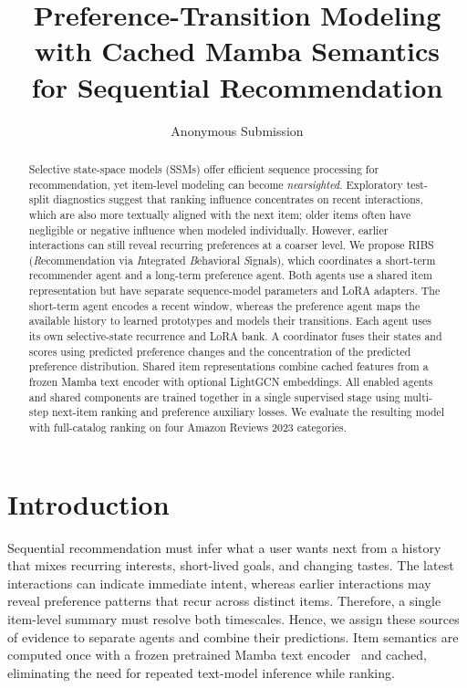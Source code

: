 ﻿\documentclass[sigconf,anonymous,review]{acmart}
\title{Preference-Transition Modeling with Cached Mamba Semantics\\for Sequential Recommendation}
\author{Anonymous Submission}
\begin{document}
\begin{abstract}
Selective state-space models (SSMs) offer efficient sequence processing for recommendation, yet item-level modeling can become \emph{nearsighted}. Exploratory test-split diagnostics suggest that ranking influence concentrates on recent interactions, which are also more textually aligned with the next item; older items often have negligible or negative influence when modeled individually. However, earlier interactions can still reveal recurring preferences at a coarser level. We propose RIBS (\emph{R}ecommendation via \emph{I}ntegrated \emph{B}ehavioral \emph{S}ignals), which coordinates a short-term recommender agent and a long-term preference agent. Both agents use a shared item representation but have separate sequence-model parameters and LoRA adapters. The short-term agent encodes a recent window, whereas the preference agent maps the available history to learned prototypes and models their transitions. Each agent uses its own selective-state recurrence and LoRA bank. A coordinator fuses their states and scores using predicted preference changes and the concentration of the predicted preference distribution. Shared item representations combine cached features from a frozen Mamba text encoder with optional LightGCN embeddings. All enabled agents and shared components are trained together in a single supervised stage using multi-step next-item ranking and preference auxiliary losses. We evaluate the resulting model with full-catalog ranking on four Amazon Reviews 2023 categories.
\end{abstract}
\maketitle

\section{Introduction}
Sequential recommendation must infer what a user wants next from a history that mixes recurring interests, short-lived goals, and changing tastes. The latest interactions can indicate immediate intent, whereas earlier interactions may reveal preference patterns that recur across distinct items. Therefore, a single item-level summary must resolve both timescales. Hence, we assign these sources of evidence to separate agents and combine their predictions. Item semantics are computed once with a frozen pretrained Mamba text encoder~\citep{Mamba} and cached, eliminating the need for repeated text-model inference while ranking.
\end{document}
